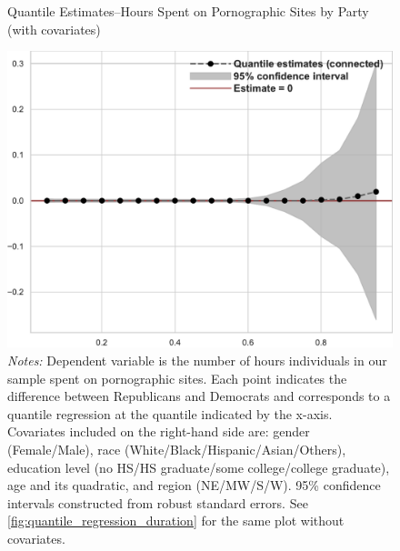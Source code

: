 \documentclass[12pt, letterpaper]{article}
\begin{document}
\begin{figure}[ht]
	\centering
	\caption{Quantile Estimates--Hours Spent on Pornographic Sites by Party (with covariates)}
	\includegraphics[width=.55\linewidth]{../figs/quantile_reg_covariates_duration_adult.pdf}
	\caption*{\footnotesize \emph{Notes:} 
		Dependent variable is the number of hours individuals in our sample spent on pornographic sites.
		Each point indicates the difference between Republicans and Democrats and corresponds to a quantile regression at the quantile indicated by the x-axis.
		Covariates included on the right-hand side are: gender (Female/Male), race (White/Black/Hispanic/Asian/Others), education level (no HS/HS graduate/some college/college graduate), age and its quadratic, and region (NE/MW/S/W).
		95\% confidence intervals constructed from robust standard errors.
		See \cref{fig:quantile_regression_duration} for the same plot without covariates.
	}
	\label{fig:quantile_regression_duration_covariates}
\end{figure}
\end{document}
